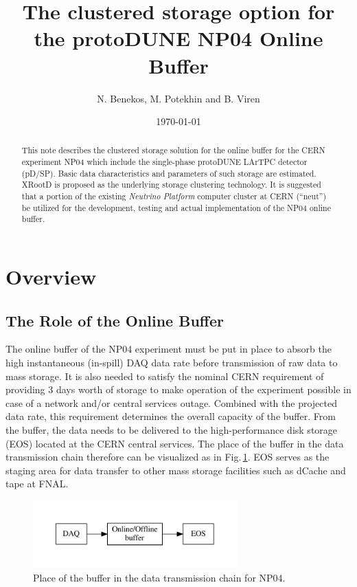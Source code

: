 \documentclass[pdftex,12pt,letter]{article}
\title{The clustered storage option for the protoDUNE NP04 Online Buffer}
\date{\today}
\author{N. Benekos, M. Potekhin and B. Viren}
\newcommand{\pdsp}{pD/SP\xspace}
\newcommand{\xrd}{XRootD\xspace}
\begin{document}
\maketitle

\begin{abstract}
\noindent  This note describes the clustered storage
solution for the online buffer for the CERN experiment NP04 which include the single-phase protoDUNE LArTPC detector (\pdsp).
Basic data characteristics and  parameters of such storage are estimated. \xrd is proposed as the underlying
storage clustering technology. It is suggested that a portion of the existing   \textit{Neutrino Platform}
computer cluster at CERN (``neut'') be utilized for the development, testing and actual implementation of the NP04 online buffer. 
\end{abstract}

\section{Overview}
\subsection{The Role of the Online Buffer}
\label{sec:the_role}
The online buffer of the NP04 experiment must be put in place to absorb the high instantaneous (in-spill) DAQ
data rate before transmission of raw data to mass storage. It is also needed to satisfy the nominal CERN requirement of
providing 3 days worth of storage to make operation of the experiment possible in case of a network and/or central services
outage. Combined with the projected data rate, this requirement determines the overall capacity of the buffer. From the buffer,
the data needs to be delivered to the high-performance  disk storage (EOS) located at the CERN central services.
The place of the buffer in the data transmission chain therefore can be visualized as in Fig.\,\ref{fig:big-picture}.
EOS serves as the staging area for data transfer to other mass storage facilities such as dCache and tape at FNAL.
\begin{figure}[tbh]
  \centering
  \includegraphics[width=0.7\textwidth]{figures/big-picture.pdf}
  \caption{Place of the buffer in the data transmission chain for NP04.}
  \label{fig:big-picture}
\end{figure}
\end{document}
